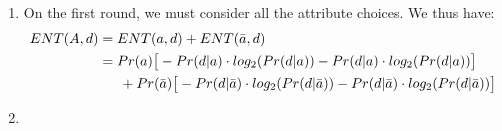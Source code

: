 \documentclass{article}
\begin{document}
\begin{enumerate}
\item On the first round, we must consider all the attribute choices.  We thus have:
	\begin{align*}
		ENT(A, d) &= ENT(a, d) + ENT(\bar a, d) \\
			&= Pr(a) \big[-Pr(d|a) \cdot log_2(Pr(d|a)) -Pr(d|a) \cdot log_2(Pr(d|a)) \big]\\
				& \indent + Pr(\bar a)  \big[-Pr(d|\bar a) \cdot log_2(Pr(d|\bar a)) 
					- Pr(d|\bar a) \cdot log_2(Pr(d|\bar a)) \big] \\
	\end{align*}
\item
\end{enumerate}
\end{document}
